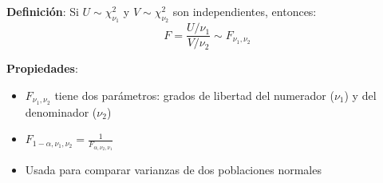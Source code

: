 \documentclass[10pt,a4paper]{article}
\begin{document}
\begin{tcolorbox}[title=Distribución F de Fisher]
    \textbf{Definición}: Si $U \sim \chi^2_{\nu_1}$ y $V \sim \chi^2_{\nu_2}$ son independientes, entonces:
    \[
        F = \frac{U/\nu_1}{V/\nu_2} \sim F_{\nu_1, \nu_2}
    \]
    
    \textbf{Propiedades}:
    \begin{itemize}
        \item $F_{\nu_1, \nu_2}$ tiene dos parámetros: grados de libertad del numerador ($\nu_1$) y del denominador ($\nu_2$)
        \item $F_{1-\alpha, \nu_1, \nu_2} = \frac{1}{F_{\alpha, \nu_2, \nu_1}}$
        \item Usada para comparar varianzas de dos poblaciones normales
    \end{itemize}
\end{tcolorbox}
\end{document}
